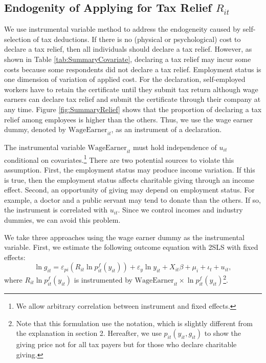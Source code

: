 \documentclass[
  11pt,
  a4paper,
]{article}
\begin{document}
\hypertarget{endogenity-of-applying-for-tax-relief-r_it}{%
\subsection{\texorpdfstring{Endogenity of Applying for Tax Relief \(R_{it}\)}{Endogenity of Applying for Tax Relief R\_\{it\}}}\label{endogenity-of-applying-for-tax-relief-r_it}}

We use instrumental variable method to address the endogeneity caused by self-selection of tax deductions.
If there is no (physical or psychological) cost to declare a tax relief,
then all individuals should declare a tax relief.
However, as shown in Table \ref{tab:SummaryCovariate},
declaring a tax relief may incur some costs because some respondents did not declare a tax relief.
Employment status is one dimension of variation of applied cost.
For the declaration, self-employed workers have to retain the certificate until they submit tax return although wage earners can declare tax relief and submit the certificate through their company at any time.
Figure \ref{fig:SummaryRelief} shows that
the proportion of declaring a tax relief among employees is higher than the others.
Thus, we use the wage earner dummy, denoted by \(\text{WageEarner}_{it}\), as an instrument of a declaration.

The instrumental variable \(\text{WageEarner}_{it}\) must hold independence of \(u_{it}\) conditional on covariates.\footnote{We allow arbitrary correlation between instrument and fixed effects.}
There are two potential sources to violate this assumption.
First, the employment status may produce income variation.
If this is true, then the employment status affects charitable giving through an income effect.
Second, an opportunity of giving may depend on employment status.
For example, a doctor and a public servant may tend to donate than the others.
If so, the instrument is correlated with \(u_{it}\).
Since we control incomes and industry dummies, we can avoid this problem.

We take three approaches using the wage earner dummy as the instrumental variable.
First, we estimate the following outcome equation with 2SLS with fixed effects:
\begin{equation}
    \ln g_{it} = \varepsilon_{pi} (R_{it} \ln p^f_{it}(y_{it})) + \varepsilon_y \ln y_{it} 
    + X_{it}\beta +\mu_i +\iota_t +u_{it}, \label{eq:stage2}
\end{equation}
where \(R_{it} \ln p^f_{it}(y_{it})\) is instrumented by
\(\text{WageEarner}_{it} \times \ln p^f_{it}(y_{it})\)\footnote{Note that this formulation use the notation, which is slightly different from the explanation in section 2. Hereafter, we use $p_{it}(y_{it}, g_{it})$ to show the giving price not for all tax payers but for those who declare charitable giving.}.
\end{document}
